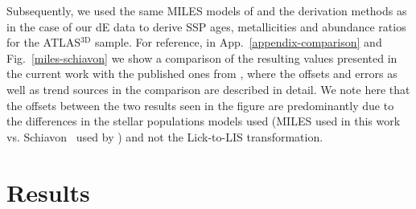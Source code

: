 \documentclass[useAMS,usenatbib]{mn2e}
\newcommand{\atlas}{ATLAS$^{\mathrm{3D}}$}
\begin{document}
Subsequently, we used the same MILES models of \cite{vazdekis:2015} and the derivation methods as in the case of our dE data to derive SSP ages, metallicities and abundance ratios for the {\atlas} sample. For reference, in App.~\ref{appendix-comparison} and Fig.~\ref{miles-schiavon} we show a comparison of the resulting values presented in the current work with the published ones from \cite{mcdermid:2015}, where the offsets and errors as well as trend sources  in the comparison are described in detail. We note here that the offsets between the two results seen in the figure are predominantly due to the differences in the stellar populations models used (MILES used in this work vs. Schiavon~\citeyear{schiavon:2007} used by \citealt{mcdermid:2015}) and not the Lick-to-LIS transformation.

\section{Results}
\end{document}
